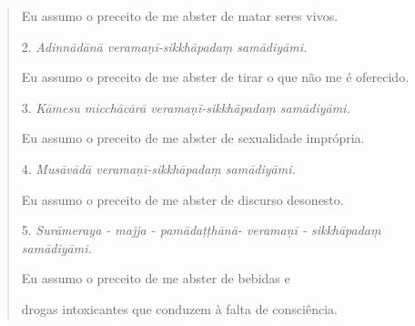 \begin{quote}
Eu assumo o preceito de me abster de matar seres vivos.

2. \emph{Adinnādānā veramaṇī-sikkhāpadaṃ samādiyāmi.}

Eu assumo o preceito de me abster de tirar o que não me é oferecido.

3. \emph{Kāmesu micchācārā veramaṇī-sikkhāpadaṃ samādiyāmi.}

Eu assumo o preceito de me abster de sexualidade imprópria.

4. \emph{Musāvādā veramaṇī-sikkhāpadaṃ samādiyāmi.}

Eu assumo o preceito de me abster de discurso desonesto.

5. \emph{Surāmeraya - majja - pamādaṭṭhānā- veramaṇī - sikkhāpadaṃ samādiyāmi.}

Eu assumo o preceito de me abster de bebidas e

drogas intoxicantes que conduzem à falta de consciência.
\end{quote}
